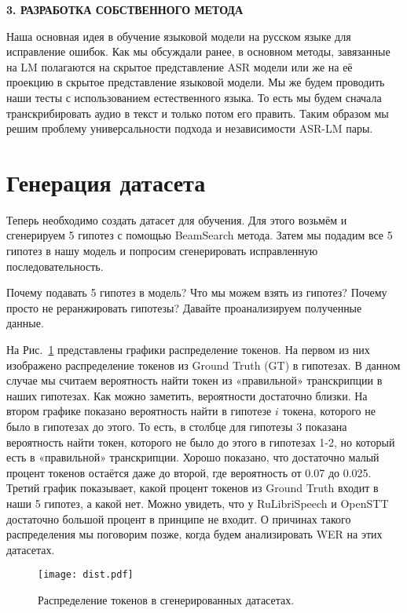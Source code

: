 \newpage
\begin{center}
  \textbf{\large 3. РАЗРАБОТКА СОБСТВЕННОГО МЕТОДА}
\end{center}

Наша основная идея в обучение языковой модели на русском языке для исправление ошибок.
Как мы обсуждали ранее, в основном методы, завязанные на LM полагаются на скрытое представление ASR модели или же на её проекцию в скрытое представление языковой модели.
Мы же будем проводить наши тесты с использованием естественного языка.
То есть мы будем сначала транскрибировать аудио в текст и только потом его править.
Таким образом мы решим проблему универсальности подхода и независимости ASR-LM пары.

\section{Генерация датасета}
Теперь необходимо создать датасет для обучения.
Для этого возьмём и сгенерируем 5 гипотез с помощью BeamSearch метода.
Затем мы подадим все 5 гипотез в нашу модель и попросим сгенерировать исправленную последовательность.

Почему подавать 5 гипотез в модель? Что мы можем взять из гипотез?
Почему просто не реранжировать гипотезы?
Давайте проанализируем полученные данные.

На Рис.~\ref{fig:dist} представлены графики распределение токенов.
На первом из них изображено распределение токенов из Ground Truth (GT) в гипотезах.
В данном случае мы считаем вероятность найти токен из «правильной» транскрипции в наших гипотезах.
Как можно заметить, вероятности достаточно близки.
На втором графике показано вероятность найти в гипотезе $i$ токена, которого не было в гипотезах до этого.
То есть, в столбце для гипотезы 3 показана вероятность найти токен, которого не было до этого в гипотезах 1-2, но который есть в «правильной» транскрипции.
Хорошо показано, что достаточно малый процент токенов остаётся даже до второй, где вероятность от 0.07 до 0.025.
Третий график показывает, какой процент токенов из Ground Truth входит в наши 5 гипотез, а какой нет.
Можно увидеть, что у RuLibriSpeech и OpenSTT достаточно большой процент в принципе не входит.
О причинах такого распределения мы поговорим позже, когда будем анализировать WER на этих датасетах.

\begin{figure}[!t]
  \centering
  \texttt{[image: dist.pdf]}
  \caption{Распределение токенов в сгенерированных датасетах.}
  \label{fig:dist}
\end{figure}

